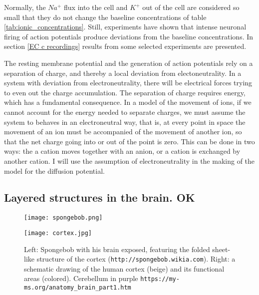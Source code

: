 \documentclass{article}
\begin{document}
Normally, the $Na^+$ flux into the cell and $K^+$ out of the cell are considered so small that they do not change the baseline concentrations of table \ref{tab:ionic_concentrations}. Still, experiments \cite{Dietzel1982}\cite{Nicholson1987}\cite{CordingleySomjen} have shown that intense neuronal firing of action potentials produce deviations from the baseline concentrations. In section \ref{EC c recordings} results from some selected experiments are presented.


The resting membrane potential and the generation of action potentials rely on a separation of charge, and thereby a local deviation from electoneutrality. In a system with deviation from electroneutrality, there will be electrical forces trying to even out the charge accumulation. The separation of charge requires energy, which has a fundamental consequence. In a model of the movement of ions, if we cannot account for the energy needed to separate charges, we must assume the system to behaves in an electroneutral way, that is, at every point in space the movement of an ion must be accompanied of the movement of another ion, so that the net charge going into or out of the point is zero. This can be done in two ways: the a cation moves together with an anion, or a cation is exchanged by another cation. I will use the assumption of electroneutrality in the making of the model for the diffusion potential.

\subsection{Layered structures in the brain. OK}\label{Layered structures}
\begin{figure}[!tbp]
  \centering
  \begin{minipage}[b]{0.45\textwidth}
    \texttt{[image: spongebob.png]}
  \end{minipage}
  \begin{minipage}[b]{0.45\textwidth}
    \texttt{[image: cortex.jpg]}
  \end{minipage}  
   \caption{Left: Spongebob with his brain exposed, featuring the folded sheet-like structure of the cortex (\texttt{http://spongebob.wikia.com}). Right: a schematic drawing of the human cortex (beige) and its functional areas (colored). Cerebellum in purple \texttt{https://my-ms.org/anatomy\_brain\_part1.htm}}
  \label{fig:spongebob}
\end{figure}
\end{document}
